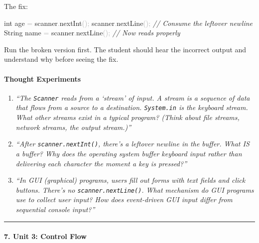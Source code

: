 \documentclass[
  justified,
  openright,
]{tufte-book}
\let\subsection\paragraph
\let\paragraph\paragraph
\newcommand{\CommentTok}[1]{\textcolor{CodeComment}{\textit{#1}}}  %
\newcommand{\CodeFuncTok}[1]{\textcolor{CodeKeyword}{#1}}           %
\newcommand{\CodeTypeTok}[1]{\textcolor{CodeType}{#1}}              %
\newcommand{\OperatorTok}[1]{\textcolor{DarkGray}{#1}}              %
\newenvironment{Shaded}{%
  \begin{mdframed}[style=TufteCode]%
}{%
  \end{mdframed}%
}
\let\subsection\paragraph
\let\paragraph\paragraph
\begin{document}
The fix:

\begin{Shaded}
\begin{Highlighting}[]
\CodeTypeTok{int} age \OperatorTok{=} scanner\OperatorTok{.}\CodeFuncTok{nextInt}\OperatorTok{();}
scanner\OperatorTok{.}\CodeFuncTok{nextLine}\OperatorTok{();}          \CommentTok{// Consume the leftover newline}
String name \OperatorTok{=} scanner\OperatorTok{.}\CodeFuncTok{nextLine}\OperatorTok{();}   \CommentTok{// Now reads properly}
\end{Highlighting}
\end{Shaded}

Run the broken version first. The student should hear the incorrect
output and understand why before seeing the fix.

\paragraph{Thought Experiments}\label{thought-experiments-33}

\begin{enumerate}
\def\labelenumi{\arabic{enumi}.}
\item
  \emph{``The \texttt{Scanner} reads from a `stream' of input. A stream
  is a sequence of data that flows from a source to a destination.
  \texttt{System.in} is the keyboard stream. What other streams exist in
  a typical program? (Think about file streams, network streams, the
  output stream.)''}
\item
  \emph{``After \texttt{scanner.nextInt()}, there's a leftover newline
  in the buffer. What IS a buffer? Why does the operating system buffer
  keyboard input rather than delivering each character the moment a key
  is pressed?''}
\item
  \emph{``In GUI (graphical) programs, users fill out forms with text
  fields and click buttons. There's no \texttt{scanner.nextLine()}. What
  mechanism do GUI programs use to collect user input? How does
  event-driven GUI input differ from sequential console input?''}
\end{enumerate}

\begin{center}\rule{0.5\linewidth}{0.5pt}\end{center}

\subsection{7. Unit 3: Control Flow}\label{unit-3-control-flow-1}
\end{document}
